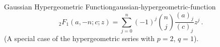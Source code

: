 \begin{definition}{Gaussian Hypergeometric Function}{gaussian-hypergeometric-function}
  $${}_2 F_1(a,-n;c;z) = \sum_{j=0}^n (-1)^j \binom{n}{j} \frac{(a)_j}{(c)_j}z^j\,.$$
  (A special case of the hypergeometric series with $p=2$, $q=1$).
\end{definition}
